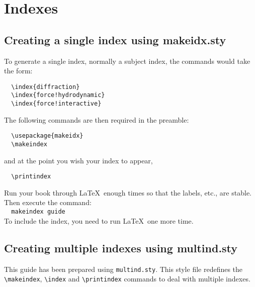 
\chapter{Indexes}
\label{indexes}

\section{Creating a single index using makeidx.sty}
To generate a single index, normally a subject index, the commands would take the form:
\begin{verbatim}
  \index{diffraction}
  \index{force!hydrodynamic}
  \index{force!interactive}
\end{verbatim}
The following commands are then required in the preamble:
\begin{verbatim}
  \usepackage{makeidx}
  \makeindex
\end{verbatim}
and at the point you wish your index to appear,
\begin{verbatim}
  \printindex
\end{verbatim}
Run your book through \LaTeX\ enough times so that the labels, etc., are stable. Then execute the command:\\[0.5\baselineskip]
\verb"  makeindex "{\verbatimsize\texttt{\cambridge guide}}\\[0.5\baselineskip]
To include the index, you need to run \LaTeX\ one more time.


\section{Creating multiple indexes using multind.sty}
This guide has been prepared using \verb"multind.sty". This style file redefines the \verb"\makeindex", \verb"\index" and \verb"\printindex" commands to deal with multiple indexes.

